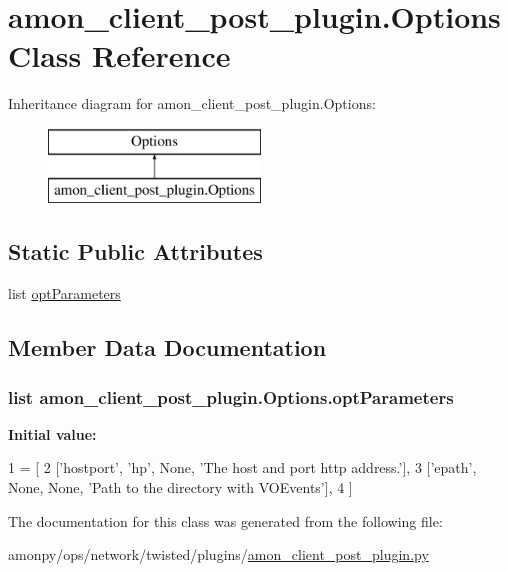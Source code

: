 \hypertarget{classamon__client__post__plugin_1_1_options}{\section{amon\-\_\-client\-\_\-post\-\_\-plugin.\-Options Class Reference}
\label{classamon__client__post__plugin_1_1_options}
}
Inheritance diagram for amon\-\_\-client\-\_\-post\-\_\-plugin.\-Options\-:\begin{figure}[H]
\begin{center}
\leavevmode
\includegraphics[height=2.000000cm]{classamon__client__post__plugin_1_1_options}
\end{center}
\end{figure}
\subsection*{Static Public Attributes}
\begin{DoxyCompactItemize}
\item 
list \hyperlink{classamon__client__post__plugin_1_1_options_a3ef4603fe9e534ae26702c562ad5dbb0}{opt\-Parameters}
\end{DoxyCompactItemize}


\subsection{Member Data Documentation}
\hypertarget{classamon__client__post__plugin_1_1_options_a3ef4603fe9e534ae26702c562ad5dbb0}{
\subsubsection[{opt\-Parameters}]{\setlength{\rightskip}{0pt plus 5cm}list amon\-\_\-client\-\_\-post\-\_\-plugin.\-Options.\-opt\-Parameters\hspace{0.3cm}{\ttfamily [static]}}}\label{classamon__client__post__plugin_1_1_options_a3ef4603fe9e534ae26702c562ad5dbb0}
{\bfseries Initial value\-:}
\begin{DoxyCode}
1 = [
2         [\textcolor{stringliteral}{'hostport'}, \textcolor{stringliteral}{'hp'}, \textcolor{keywordtype}{None}, \textcolor{stringliteral}{'The host and port http address.'}],
3         [\textcolor{stringliteral}{'epath'}, \textcolor{keywordtype}{None}, \textcolor{keywordtype}{None}, \textcolor{stringliteral}{'Path to the directory with VOEvents'}],
4         ]
\end{DoxyCode}


The documentation for this class was generated from the following file\-:\begin{DoxyCompactItemize}
\item 
amonpy/ops/network/twisted/plugins/\hyperlink{amon__client__post__plugin_8py}{amon\-\_\-client\-\_\-post\-\_\-plugin.\-py}\end{DoxyCompactItemize}
